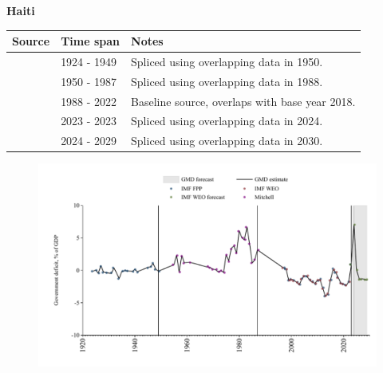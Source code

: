 \documentclass[12pt,a4paper,landscape]{article}
\begin{document}
\begin{adjustbox}{max totalsize={\paperwidth}{\paperheight},center}
\begin{minipage}[t][\textheight][t]{\textwidth}
\vspace*{0.5cm}
{}
\begin{center}
{\Large\bfseries Haiti}
\end{center}
\vspace{0.5cm}
\begin{table}[H]
\centering
\small
\begin{tabular}{|l|l|l|}
\hline
\textbf{Source} & \textbf{Time span} & \textbf{Notes} \\
\hline
\rowcolor{white}\cite{IMF_FPP}& 1924 - 1949 &Spliced using overlapping data in 1950.\\
\rowcolor{lightgray}\cite{Mitchell}& 1950 - 1987 &Spliced using overlapping data in 1988.\\
\rowcolor{white}\cite{IMF_WEO}& 1988 - 2022 &Baseline source, overlaps with base year 2018.\\
\rowcolor{lightgray}\cite{IMF_FPP}& 2023 - 2023 &Spliced using overlapping data in 2024.\\
\rowcolor{white}\cite{IMF_WEO_forecast}& 2024 - 2029 &Spliced using overlapping data in 2030.\\
\hline
\end{tabular}
\end{table}
\begin{figure}[H]
\centering
\includegraphics[width=\textwidth,height=0.6\textheight,keepaspectratio]{graphs/HTI_govdef_GDP.pdf}
\end{figure}
\end{minipage}
\end{adjustbox}
\end{document}
